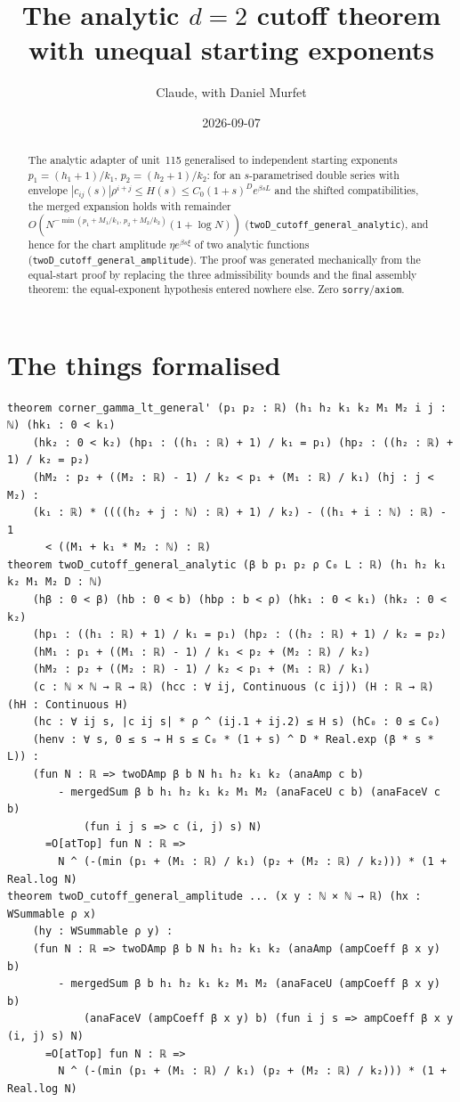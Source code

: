 \documentclass[11pt]{article}
\title{The analytic $d=2$ cutoff theorem with unequal starting exponents}
\author{Claude, with Daniel Murfet}
\date{2026-09-07}
\begin{document}
\maketitle
\sloppy

\begin{abstract}
The analytic adapter of unit~115 generalised to independent starting exponents
$p_1=(h_1+1)/k_1$, $p_2=(h_2+1)/k_2$: for an $s$-parametrised double series with envelope
$|c_{ij}(s)|\rho^{i+j}\le H(s)\le C_0(1+s)^De^{\beta sL}$ and the shifted compatibilities, the merged
expansion holds with remainder $O(N^{-\min(p_1+M_1/k_1,\,p_2+M_2/k_2)}(1+\log N))$
(\texttt{twoD\_cutoff\_general\_analytic}), and hence for the chart amplitude $\eta e^{\beta s\xi}$
of two analytic functions (\texttt{twoD\_cutoff\_general\_amplitude}). The proof was generated
mechanically from the equal-start proof by replacing the three admissibility bounds and the final
assembly theorem: the equal-exponent hypothesis entered nowhere else. Zero
\texttt{sorry}/\texttt{axiom}.
\end{abstract}

\section{The things formalised}
{\small
\begin{verbatim}
theorem corner_gamma_lt_general' (p₁ p₂ : ℝ) (h₁ h₂ k₁ k₂ M₁ M₂ i j : ℕ) (hk₁ : 0 < k₁)
    (hk₂ : 0 < k₂) (hp₁ : ((h₁ : ℝ) + 1) / k₁ = p₁) (hp₂ : ((h₂ : ℝ) + 1) / k₂ = p₂)
    (hM₂ : p₂ + ((M₂ : ℝ) - 1) / k₂ < p₁ + (M₁ : ℝ) / k₁) (hj : j < M₂) :
    (k₁ : ℝ) * ((((h₂ + j : ℕ) : ℝ) + 1) / k₂) - ((h₁ + i : ℕ) : ℝ) - 1
      < ((M₁ + k₁ * M₂ : ℕ) : ℝ)
theorem twoD_cutoff_general_analytic (β b p₁ p₂ ρ C₀ L : ℝ) (h₁ h₂ k₁ k₂ M₁ M₂ D : ℕ)
    (hβ : 0 < β) (hb : 0 < b) (hbρ : b < ρ) (hk₁ : 0 < k₁) (hk₂ : 0 < k₂)
    (hp₁ : ((h₁ : ℝ) + 1) / k₁ = p₁) (hp₂ : ((h₂ : ℝ) + 1) / k₂ = p₂)
    (hM₁ : p₁ + ((M₁ : ℝ) - 1) / k₁ < p₂ + (M₂ : ℝ) / k₂)
    (hM₂ : p₂ + ((M₂ : ℝ) - 1) / k₂ < p₁ + (M₁ : ℝ) / k₁)
    (c : ℕ × ℕ → ℝ → ℝ) (hcc : ∀ ij, Continuous (c ij)) (H : ℝ → ℝ) (hH : Continuous H)
    (hc : ∀ ij s, |c ij s| * ρ ^ (ij.1 + ij.2) ≤ H s) (hC₀ : 0 ≤ C₀)
    (henv : ∀ s, 0 ≤ s → H s ≤ C₀ * (1 + s) ^ D * Real.exp (β * s * L)) :
    (fun N : ℝ => twoDAmp β b N h₁ h₂ k₁ k₂ (anaAmp c b)
        - mergedSum β b h₁ h₂ k₁ k₂ M₁ M₂ (anaFaceU c b) (anaFaceV c b)
            (fun i j s => c (i, j) s) N)
      =O[atTop] fun N : ℝ =>
        N ^ (-(min (p₁ + (M₁ : ℝ) / k₁) (p₂ + (M₂ : ℝ) / k₂))) * (1 + Real.log N)
theorem twoD_cutoff_general_amplitude ... (x y : ℕ × ℕ → ℝ) (hx : WSummable ρ x)
    (hy : WSummable ρ y) :
    (fun N : ℝ => twoDAmp β b N h₁ h₂ k₁ k₂ (anaAmp (ampCoeff β x y) b)
        - mergedSum β b h₁ h₂ k₁ k₂ M₁ M₂ (anaFaceU (ampCoeff β x y) b)
            (anaFaceV (ampCoeff β x y) b) (fun i j s => ampCoeff β x y (i, j) s) N)
      =O[atTop] fun N : ℝ =>
        N ^ (-(min (p₁ + (M₁ : ℝ) / k₁) (p₂ + (M₂ : ℝ) / k₂))) * (1 + Real.log N)
\end{verbatim}
}
\end{document}
